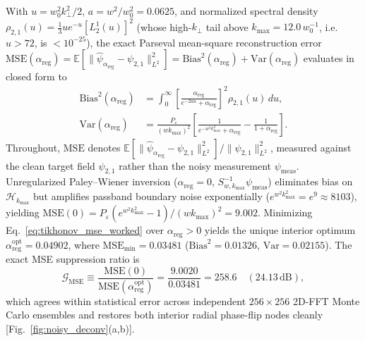 \documentclass[aps,pra,reprint,nofootinbib,floatfix,longbibliography]{revtex4-2}
\newcommand{\norm}[1]{\lVert #1 \rVert}
\begin{document}
With $u = w_0^2 k_\perp^2/2$, $a = w^2/w_0^2 = 0.0625$, and normalized spectral density $\rho_{2,1}(u) = \frac{1}{3}u e^{-u}[L_2^1(u)]^2$ (whose high-$k_\perp$ tail above $k_{\max} = 12.0\,w_0^{-1}$, i.e.\ $u > 72$, is $< 10^{-25}$), the exact Parseval mean-square reconstruction error $\mathrm{MSE}(\alpha_{\mathrm{reg}}) = \mathbb{E}[\norm{\hat{\psi}_{\alpha_{\mathrm{reg}}} - \psi_{2,1}}_{L^2}^2] = \mathrm{Bias}^2(\alpha_{\mathrm{reg}}) + \mathrm{Var}(\alpha_{\mathrm{reg}})$ evaluates in closed form to
\begin{align}
\mathrm{Bias}^2(\alpha_{\mathrm{reg}}) &= \int_0^\infty \left[\frac{\alpha_{\mathrm{reg}}}{e^{-2au} + \alpha_{\mathrm{reg}}}\right]^2 \rho_{2,1}(u)\,du, \nonumber \\
\mathrm{Var}(\alpha_{\mathrm{reg}}) &= \frac{P_\varepsilon}{(w k_{\max})^2} \left[\frac{1}{e^{-w^2 k_{\max}^2} + \alpha_{\mathrm{reg}}} - \frac{1}{1 + \alpha_{\mathrm{reg}}}\right].
\label{eq:tikhonov_mse_worked}
\end{align}
Throughout, $\mathrm{MSE}$ denotes $\mathbb{E}[\norm{\hat{\psi}_{\alpha_{\mathrm{reg}}} - \psi_{2,1}}_{L^2}^2]/\norm{\psi_{2,1}}_{L^2}^2$, measured against the clean target field $\psi_{2,1}$ rather than the noisy measurement $\psi_{\mathrm{meas}}$. Unregularized Paley--Wiener inversion ($\alpha_{\mathrm{reg}} = 0$, $S_{w,k_{\max}}^{-1}\psi_{\mathrm{meas}}$) eliminates bias on $\mathcal{H}_{k_{\max}}$ but amplifies passband boundary noise exponentially ($e^{w^2 k_{\max}^2} = e^9 \approx 8103$), yielding $\mathrm{MSE}(0) = P_\varepsilon(e^{w^2 k_{\max}^2} - 1)/(w k_{\max})^2 = 9.002$. Minimizing Eq.~\eqref{eq:tikhonov_mse_worked} over $\alpha_{\mathrm{reg}} > 0$ yields the unique interior optimum $\alpha_{\mathrm{reg}}^{\mathrm{opt}} = 0.04902$, where $\mathrm{MSE}_{\min} = 0.03481$ ($\mathrm{Bias}^2 = 0.01326$, $\mathrm{Var} = 0.02155$). The exact MSE suppression ratio is
\begin{equation}
\mathcal{G}_{\mathrm{MSE}} \equiv \frac{\mathrm{MSE}(0)}{\mathrm{MSE}(\alpha_{\mathrm{reg}}^{\mathrm{opt}})} = \frac{9.0020}{0.03481} = 258.6 \quad (24.13\,\mathrm{dB}),
\label{eq:mse_ratio_exact}
\end{equation}
which agrees within statistical error across independent $256\times 256$ 2D-FFT Monte Carlo ensembles and restores both interior radial phase-flip nodes cleanly [Fig.~\ref{fig:noisy_deconv}(a,b)].
\end{document}
